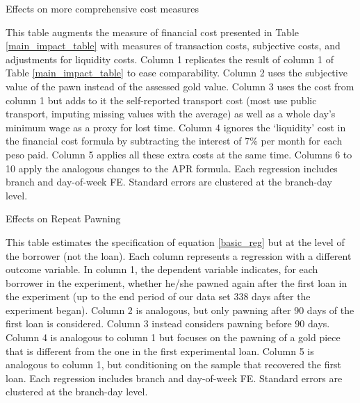 \documentclass[oneside,11pt]{article}
\begin{document}
\begin{table}[H]
\caption{Effects on more comprehensive cost measures}
\label{table_robustness_fc}
\begin{center}
\scriptsize{}
\end{center}
 \scriptsize 
 This table augments the measure of financial cost presented in Table \ref{main_impact_table} with measures of transaction costs, subjective costs, and adjustments for liquidity costs. Column 1 replicates the result of column 1 of Table \ref{main_impact_table} to ease comparability. Column 2 uses the subjective value of the pawn instead of the assessed gold value. Column 3 uses the cost from column 1 but adds to it the self-reported transport cost (most use public transport, imputing missing values with the average) as well as a whole day's minimum wage as a proxy for lost time. Column 4 ignores the `liquidity' cost in the financial cost formula by subtracting the interest of 7\% per month for each peso paid. Column 5 applies all these extra costs at the same time. Columns 6 to 10 apply the analogous changes to the APR formula. Each regression includes branch and day-of-week FE. Standard errors are clustered at the branch-day level.


\end{table}





\cleardoublepage



\begin{table}[H]
\caption{Effects on Repeat Pawning}
\label{repeat_loans}
\begin{center}
\scriptsize{}
\end{center}
 \scriptsize
This table estimates the specification of equation \ref{basic_reg} but at the level of the borrower (not the loan). Each column represents a regression with a different outcome variable. In column 1, the dependent variable indicates, for each borrower in the experiment, whether he/she pawned again after the first loan in the experiment (up to the end period of our data set 338 days after the experiment began). Column 2 is analogous, but only pawning after 90 days of the first loan is considered. Column 3 instead considers pawning before 90 days. Column 4 is analogous to column 1 but focuses on the pawning of a gold piece that is different from the one in the first experimental loan. Column 5 is analogous to column 1, but conditioning on the sample that recovered the first loan. Each regression includes branch and day-of-week FE. Standard errors are clustered at the branch-day level.
\end{table}
\end{document}
